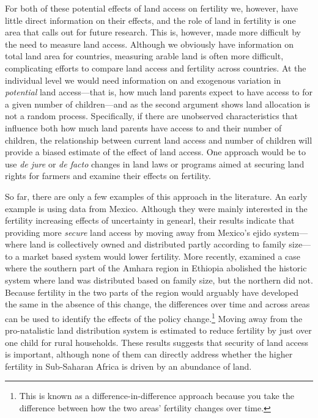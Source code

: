 For both of these potential effects of land access on fertility we, however, have little direct information on their effects, and the role of land in fertility is one area that calls out for future research. This is, however, made more difficult by the need to measure land access. Although we obviously have information on total land area for countries, measuring arable land is often more difficult, complicating efforts to compare land access and fertility across countries. At the individual level we would need information on and exogenous variation in \emph{potential} land access---that is, how much land parents expect to have access to for a given number of children---and as the second argument shows land allocation is not a random process. Specifically, if there are unobserved characteristics that influence both how much land parents have access to and their number of children, the relationship between current land access and number of children will provide a biased estimate of the effect of land access. One approach would be to use \emph{de jure} or \emph{de facto} changes in land laws or programs aimed at securing land rights for farmers and examine their effects on fertility.

So far, there are only a few examples of this approach in the literature. An early example is \citep{de_vany77} using data from Mexico. Although they were mainly interested in the fertility increasing effects of uncertainty in genearl, their results indicate that providing more \emph{secure} land access by moving away from Mexico's ejido system---where land is collectively owned and distributed partly according to family size---to a market based system would lower fertility. More recently, \citep{Ali2015} examined a case where the southern part of the Amhara region in Ethiopia abolished the historic system where land was distributed based on family size, but the northern did not. Because fertility in the two parts of the region would arguably have developed the same in the absence of this change, the differences over time and across areas can be used to identify the effects of the policy change.\footnote{This is known as a difference-in-difference approach because you take the difference between how the two areas' fertility changes over time.} Moving away from the pro-natalistic land distribution system is estimated to reduce fertility by just over one child for rural households. These results suggests that security of land access is important, although none of them can directly address whether the higher fertility in Sub-Saharan Africa is driven by an abundance of land.


